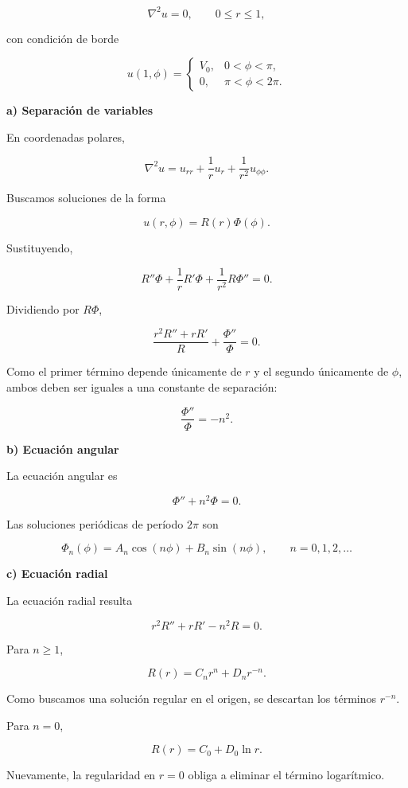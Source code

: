 \documentclass[11pt,spanish]{article}
\begin{document}
\[
\nabla^2 u = 0,
\qquad
0\le r\le 1,
\]

con condición de borde

\[
u(1,\phi)=
\begin{cases}
V_0,&0<\phi<\pi,\\
0,&\pi<\phi<2\pi.
\end{cases}
\]

{\bf a) Separación de variables}

En coordenadas polares,

\[
\nabla^2u
=
u_{rr}
+\frac1r u_r
+\frac1{r^2}u_{\phi\phi}.
\]

Buscamos soluciones de la forma

\[
u(r,\phi)=R(r)\Phi(\phi).
\]

Sustituyendo,

\[
R''\Phi
+\frac1rR'\Phi
+\frac1{r^2}R\Phi''
=0.
\]

Dividiendo por \(R\Phi\),

\[
\frac{r^2R''+rR'}{R}
+
\frac{\Phi''}{\Phi}
=0.
\]

Como el primer término depende únicamente de \(r\) y el segundo únicamente de
\(\phi\), ambos deben ser iguales a una constante de separación:

\[
\frac{\Phi''}{\Phi}=-n^2.
\]


{\bf b) Ecuación angular}

La ecuación angular es

\[
\Phi''+n^2\Phi=0.
\]

Las soluciones periódicas de período \(2\pi\) son

\[
\Phi_n(\phi)
=
A_n\cos(n\phi)
+
B_n\sin(n\phi),
\qquad
n=0,1,2,\ldots
\]


{\bf c) Ecuación radial}

La ecuación radial resulta

\[
r^2R''
+rR'
-n^2R=0.
\]

Para \(n\ge1\),

\[
R(r)=C_nr^n+D_nr^{-n}.
\]

Como buscamos una solución regular en el origen, se descartan los términos
\(r^{-n}\).

Para \(n=0\),

\[
R(r)=C_0+D_0\ln r.
\]

Nuevamente, la regularidad en \(r=0\) obliga a eliminar el término logarítmico.
\end{document}

